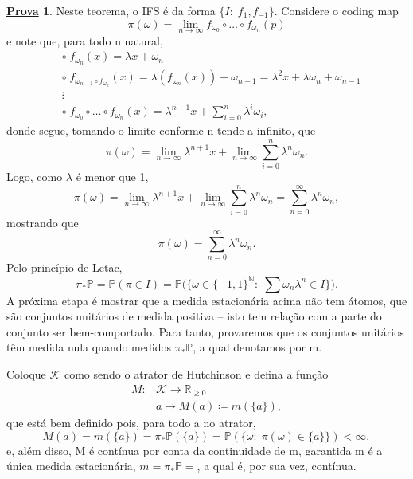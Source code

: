 \documentclass[12pt]{article}
\theoremstyle{definition}
\newtheorem*{proof*}{\underline{Prova}}
\begin{document}
\begin{proof*}
	Neste teorema, o IFS é da forma \(\{I:\; f_1, f_{-1}\}\). Considere o coding map
	\[
		\pi (\omega ) = \lim_{n\to \infty}f_{\omega_{0}}\circ \dotsc \circ f_{\omega_{n}}(p)
	\]
	e note que, para todo n natural,
	\begin{align*}
		 & \circ\; f_{\omega_{n}}(x) = \lambda x + \omega_{n}                                                                                             \\
		 & \circ\; f_{\omega_{n-1}\circ f_{\omega_{n}}}(x) = \lambda (f_{\omega_{n}}(x)) + \omega_{n-1} = \lambda^{2}x + \lambda\omega_{n} + \omega_{n-1} \\
		 & \vdots                                                                                                                                         \\
		 & \circ\; f_{\omega_{0}}\circ \dotsc \circ f_{\omega_{n}}(x) = \lambda^{n+1}x + \sum\limits_{i=0}^{n}\lambda^{i}\omega_{i},
	\end{align*}
	donde segue, tomando o limite conforme n tende a infinito, que
	\[
		\pi (\omega ) = \lim_{n\to \infty}\lambda^{n+1}x + \lim_{n\to \infty}\sum\limits_{i=0}^{n}\lambda^{n}\omega_{n}.
	\]
	Logo, como \(\lambda \) é menor que 1,
	\[
		\pi (\omega ) =\lim_{n\to \infty}\lambda^{n+1}x + \lim_{n\to \infty}\sum\limits_{i=0}^{n}\lambda^{n}\omega_{n} = \sum\limits_{n=0}^{\infty}\lambda ^{n}\omega_{n},
	\]
	mostrando que
	\[
		\pi (\omega ) = \sum\limits_{n=0}^{\infty}\lambda^{n}\omega_{n}.
	\]
	Pelo princípio de Letac,
	\[
		\pi_{*}\mathbb{P} = \mathbb{P}(\pi \in I) = \mathbb{P}\biggl(\biggl\{\omega \in \{-1, 1\}^{\mathbb{N}}:\; \sum \omega_{n}\lambda ^{n}\in I\biggr\}\biggr).
	\]
	A próxima etapa é mostrar que a medida estacionária acima não tem átomos, que são conjuntos unitários de medida positiva -- isto tem relação com a parte do conjunto ser bem-comportado. Para tanto, provaremos que os conjuntos unitários têm medida nula quando medidos \(\pi_{*}\mathbb{P}\), a qual denotamos por m.

	Coloque \(\mathcal{K}\) como sendo o atrator de Hutchinson e defina a função
	\begin{align*}
		M: & \mathcal{K}\rightarrow\mathbb{R}_{\geq 0} \\
		   & a\longmapsto M(a)\coloneqq m(\{a\}),
	\end{align*}
	que está bem definido pois, para todo a no atrator,
	\[
		M(a) = m(\{a\}) = \pi_{*}\mathbb{P}(\{a\}) = \mathbb{P}(\{\omega :\; \pi (\omega )\in \{a\}\}) < \infty,
	\]
	e, além disso, M é contínua por conta da continuidade de m, garantida m é a única medida estacionária, \(m=\pi_{*}\mathbb{P}=\), a qual é, por sua vez, contínua.


\end{proof*}
\end{document}
